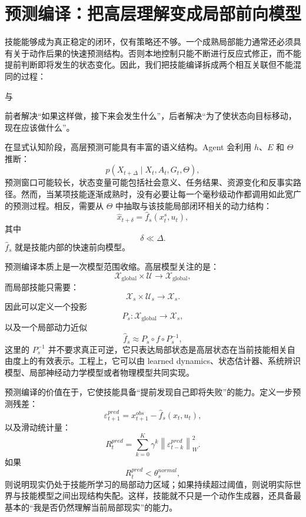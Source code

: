 \section{预测编译：把高层理解变成局部前向模型}

技能能够成为真正稳定的闭环，仅有策略还不够。一个成熟局部能力通常还必须具有关于动作后果的快速预测结构。否则本地控制只能不断进行反应式修正，而不能提前判断即将发生的状态变化。因此，我们把技能编译拆成两个相互关联但不能混同的过程：
\begin{statementbox}
\centering
{}
\end{statementbox}
与
\begin{statementbox}
\centering
{}
\end{statementbox}
前者解决“如果这样做，接下来会发生什么”，后者解决“为了使状态向目标移动，现在应该做什么”。

在显式认知阶段，高层预测可能具有丰富的语义结构。Agent 会利用 $h$、$E$ 和 $\Theta$ 推断：
\[
p(X_{t+\Delta}\mid X_t,A_t,G_t,\Theta),
\]
预测窗口可能较长，状态变量可能包括社会意义、任务结果、资源变化和反事实路径。然而，当某项技能逐渐成熟时，没有必要让每一个毫秒级动作都调用如此宽广的预测过程。相反，需要从 $\Theta$ 中抽取与该技能局部闭环相关的动力结构：
\[
\hat x_{t+\delta}
=
\hat f_s
\left(
x_t^s,
u_t
\right),
\]
其中
\[
\delta\ll\Delta.
\]
$\hat f_s$ 就是技能内部的快速前向模型。

预测编译本质上是一次模型范围收缩。高层模型关注的是：
\[
\mathcal X_{\mathrm{global}}
\times
\mathcal U
\rightarrow
\mathcal X_{\mathrm{global}},
\]
而局部技能只需要：
\[
\mathcal X_s
\times
\mathcal U_s
\rightarrow
\mathcal X_s.
\]
因此可以定义一个投影
\[
P_s:
\mathcal X_{\mathrm{global}}
\rightarrow
\mathcal X_s,
\]
以及一个局部动力近似
\[
\hat f_s
\approx
P_s\circ f\circ P_s^{-1},
\]
这里的 $P_s^{-1}$ 并不要求真正可逆，它只表达局部状态是高层状态在当前技能相关自由度上的有效表示。工程上，它可以由 learned dynamics、状态估计器、系统辨识模型、局部神经动力学模型或者物理模型共同实现。

预测编译的价值在于，它使技能具备“提前发现自己即将失败”的能力。定义一步预测残差：
\[
\varepsilon_{t+1}^{pred}
=
x_{t+1}^{obs}
-
\hat f_s(x_t,u_t),
\]
以及滑动统计量：
\[
R_t^{pred}
=
\sum_{k=0}^{K}
\gamma^k
\left\|
\varepsilon_{t-k}^{pred}
\right\|_{W}^{2}.
\]
如果
\[
R_t^{pred}<\theta_s^{normal},
\]
则说明现实仍处于技能所学习的局部动力区域；如果持续超过阈值，则说明实际世界与技能模型之间出现结构失配。这样，技能就不只是一个动作生成器，还具备最基本的“我是否仍然理解当前局部现实”的能力。

